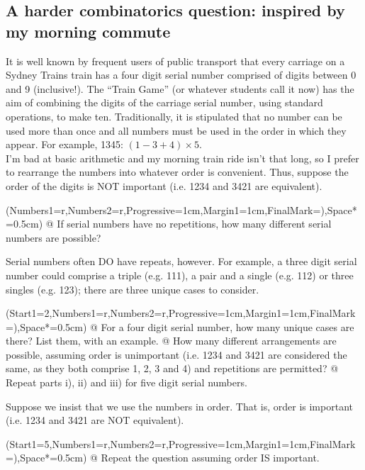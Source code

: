 \documentclass[a4paper,11pt]{article}
\begin{document}
\subsection*{A harder combinatorics question: inspired by my morning commute}
It is well known by frequent users of public transport that every carriage on a Sydney Trains train has a four digit serial number comprised of digits between 0 and 9 (inclusive!). The ``Train Game'' (or whatever students call it now) has the aim of combining the digits of the carriage serial number, using standard operations, to make ten. Traditionally, it is stipulated that no number can be used more than once and all numbers must be used in the order in which they appear. For example, 1345: $(1-3+4)\times5$.\\

\noindent I'm bad at basic arithmetic and my morning train ride isn't that long, so I prefer to rearrange the numbers into whatever order is convenient. Thus, suppose the order of the digits is NOT important (i.e. 1234 and 3421 are equivalent). \\
	\begin{easylist}[enumerate]
		\ListProperties(Numbers1=r,Numbers2=r,Progressive=1cm,Margin1=1cm,FinalMark={)},Space*=0.5cm)
		@ If serial numbers have no repetitions, how many different serial numbers are possible?
    \end{easylist}
    \vspace{0.5cm}
    \noindent Serial numbers often DO have repeats, however. For example, a three digit serial number could comprise a triple (e.g. 111), a pair and a single (e.g. 112) or three singles (e.g. 123); there are three unique cases to consider.\\
	\begin{easylist}[enumerate]
		\ListProperties(Start1=2,Numbers1=r,Numbers2=r,Progressive=1cm,Margin1=1cm,FinalMark={)},Space*=0.5cm)
        @ For a four digit serial number, how many unique cases are there? List them, with an example.
        @ How many different arrangements are possible, assuming order is unimportant (i.e. 1234 and 3421 are considered the same, as they both comprise 1, 2, 3 and 4) and repetitions are permitted?
        @ Repeat parts i), ii) and iii) for five digit serial numbers.
    \end{easylist}
    \vspace{0.5cm}
\noindent Suppose we insist that we use the numbers in order. That is, order is important (i.e. 1234 and 3421 are NOT equivalent). \\
	\begin{easylist}[enumerate]
		\ListProperties(Start1=5,Numbers1=r,Numbers2=r,Progressive=1cm,Margin1=1cm,FinalMark={)},Space*=0.5cm)
		@ Repeat the question assuming order IS important.
    \end{easylist}
\end{document}
